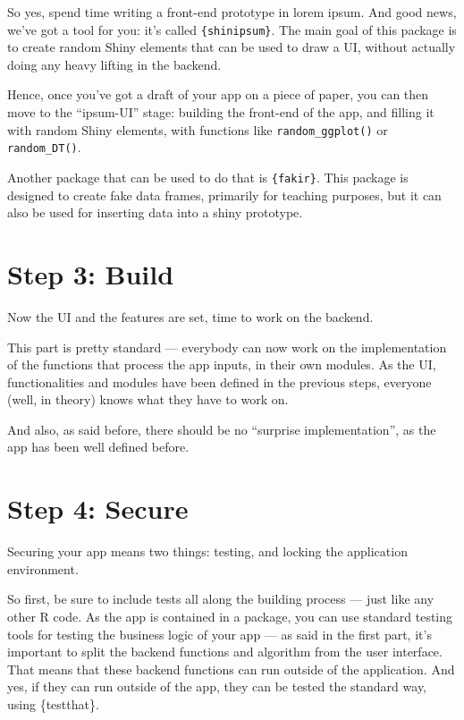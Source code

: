 \documentclass[]{book}
\begin{document}
So yes, spend time writing a front-end prototype in lorem ipsum. And good news, we've got a tool for you: it's called \texttt{\{shinipsum\}}. The main goal of this package is to create random Shiny elements that can be used to draw a UI, without actually doing any heavy lifting in the backend.

Hence, once you've got a draft of your app on a piece of paper, you can then move to the ``ipsum-UI'' stage: building the front-end of the app, and filling it with random Shiny elements, with functions like \texttt{random\_ggplot()} or \texttt{random\_DT()}.

Another package that can be used to do that is \texttt{\{fakir\}}. This package is designed to create fake data frames, primarily for teaching purposes, but it can also be used for inserting data into a shiny prototype.

\hypertarget{step-build}{%
\chapter{Step 3: Build}\label{step-build}}

Now the UI and the features are set, time to work on the backend.

This part is pretty standard --- everybody can now work on the implementation of the functions that process the app inputs, in their own modules. As the UI, functionalities and modules have been defined in the previous steps, everyone (well, in theory) knows what they have to work on.

And also, as said before, there should be no ``surprise implementation'', as the app has been well defined before.

\hypertarget{step-secure}{%
\chapter{Step 4: Secure}\label{step-secure}}

Securing your app means two things: testing, and locking the application environment.

So first, be sure to include tests all along the building process --- just like any other R code. As the app is contained in a package, you can use standard testing tools for testing the business logic of your app --- as said in the first part, it's important to split the backend functions and algorithm from the user interface. That means that these backend functions can run outside of the application. And yes, if they can run outside of the app, they can be tested the standard way, using \{testthat\}.
\end{document}
